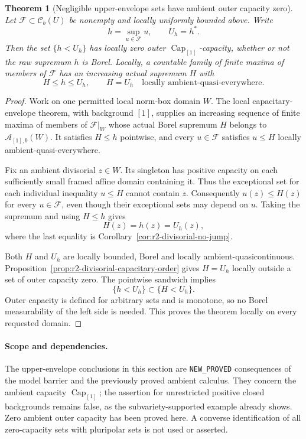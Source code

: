 \documentclass[11pt,a4paper]{article}
\numberwithin{equation}{section}
\newtheorem{theorem}{Theorem}[section]
\theoremstyle{definition}
\theoremstyle{remark}
\newcommand{\Cb}{\mathcal C_b}
\begin{document}
\begin{theorem}[Negligible upper-envelope sets have ambient outer capacity zero]
\label{thm:r2-negligible-outer-zero}
Let $\mathcal F\subset\Cb(U)$ be nonempty and locally uniformly
bounded above. Write
\[
 h=\sup_{u\in\mathcal F}u,\qquad U_h=h^*.
\]
Then the set $\{h<U_h\}$ has locally zero outer
$\operatorname{Cap}_{[1]}$-capacity, whether or not the raw
supremum $h$ is Borel. Locally, a countable family of finite
maxima of members of $\mathcal F$ has an increasing actual
supremum $H$ with
\[
 H\leq h\leq U_h,
 \qquad H=U_h\quad\text{locally ambient-quasi-everywhere}.
\]
\end{theorem}

\begin{proof}
Work on one permitted local norm-box domain $W$. The local
capacitary-envelope theorem, with background $[1]$, supplies
an increasing sequence of finite maxima of members of
$\mathcal F|_W$ whose actual Borel supremum $H$ belongs to
$\mathcal A_{[1],b}(W)$. It satisfies $H\leq h$ pointwise,
and every $u\in\mathcal F$ satisfies $u\leq H$ locally
ambient-quasi-everywhere.

Fix an ambient divisorial $z\in W$. Its singleton has
positive capacity on each sufficiently small framed affine
domain containing it. Thus the exceptional set for each
individual inequality $u\leq H$ cannot contain $z$.
Consequently $u(z)\leq H(z)$ for every $u\in\mathcal F$,
even though their exceptional sets may depend on $u$.
Taking the supremum and using $H\leq h$ gives
\[
 H(z)=h(z)=U_h(z),
\]
where the last equality is
Corollary~\ref{cor:r2-divisorial-no-jump}.

Both $H$ and $U_h$ are locally bounded, Borel and locally
ambient-quasicontinuous. Proposition~\ref{prop:r2-divisorial-capacitary-order}
gives $H=U_h$ locally outside a set of outer capacity zero.
The pointwise sandwich implies
\[
 \{h<U_h\}\subset\{H<U_h\}.
\]
Outer capacity is defined for arbitrary sets and is monotone,
so no Borel measurability of the left side is needed. This
proves the theorem locally on every requested domain.
\end{proof}

\paragraph{Scope and dependencies.}
The upper-envelope conclusions in this section are
\texttt{NEW\_PROVED} consequences of the model barrier and
the previously proved ambient calculus. They concern the
ambient capacity $\operatorname{Cap}_{[1]}$; the assertion
for unrestricted positive closed backgrounds remains false,
as the subvariety-supported example already shows. Zero
ambient outer capacity has been proved here. A converse
identification of all zero-capacity sets with pluripolar sets
is not used or asserted.
\end{document}
